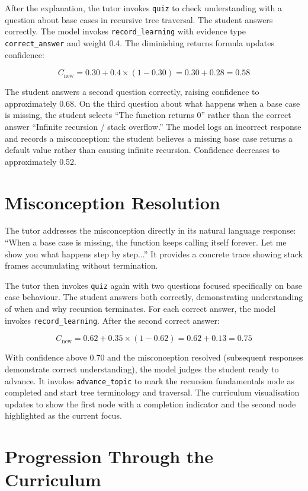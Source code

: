 \documentclass[logo,bsc,singlespacing,parskip,online]{infthesis}
\begin{document}
After the explanation, the tutor invokes \texttt{quiz} to check understanding with a question about base cases in recursive tree traversal. The student answers correctly. The model invokes \texttt{record\_learning} with evidence type \texttt{correct\_answer} and weight 0.4. The diminishing returns formula updates confidence:

\[
C_{\text{new}} = 0.30 + 0.4 \times (1 - 0.30) = 0.30 + 0.28 = 0.58
\]

The student answers a second question correctly, raising confidence to approximately 0.68. On the third question about what happens when a base case is missing, the student selects ``The function returns 0'' rather than the correct answer ``Infinite recursion / stack overflow.'' The model logs an incorrect response and records a misconception: the student believes a missing base case returns a default value rather than causing infinite recursion. Confidence decreases to approximately 0.52.

\section{Misconception Resolution}

The tutor addresses the misconception directly in its natural language response: ``When a base case is missing, the function keeps calling itself forever. Let me show you what happens step by step...'' It provides a concrete trace showing stack frames accumulating without termination.

The tutor then invokes \texttt{quiz} again with two questions focused specifically on base case behaviour. The student answers both correctly, demonstrating understanding of when and why recursion terminates. For each correct answer, the model invokes \texttt{record\_learning}. After the second correct answer:

\[
C_{\text{new}} = 0.62 + 0.35 \times (1 - 0.62) = 0.62 + 0.13 = 0.75
\]

With confidence above 0.70 and the misconception resolved (subsequent responses demonstrate correct understanding), the model judges the student ready to advance. It invokes \texttt{advance\_topic} to mark the recursion fundamentals node as completed and start tree terminology and traversal. The curriculum visualisation updates to show the first node with a completion indicator and the second node highlighted as the current focus.

\section{Progression Through the Curriculum}
\end{document}
